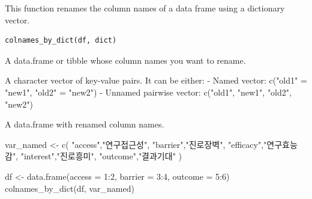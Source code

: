 \documentclass[a4paper]{book}
\begin{document}
%
\begin{Description}
This function renames the column names of a data frame using a dictionary vector.
\end{Description}
%
\begin{Usage}
\begin{verbatim}
colnames_by_dict(df, dict)
\end{verbatim}
\end{Usage}
%
\begin{Arguments}
\begin{ldescription}
\item[\code{df}] A data.frame or tibble whose column names you want to rename.

\item[\code{dict}] A character vector of key-value pairs.
It can be either:
- Named vector: c("old1" = "new1", "old2" = "new2")
- Unnamed pairwise vector: c("old1", "new1", "old2", "new2")
\end{ldescription}
\end{Arguments}
%
\begin{Value}
A data.frame with renamed column names.
\end{Value}
%
\begin{Examples}
\begin{ExampleCode}
var_named <- c(
  "access","연구접근성",
  "barrier","진로장벽",
  "efficacy","연구효능감",
  "interest","진로흥미",
  "outcome","결과기대"
)

df <- data.frame(access = 1:2, barrier = 3:4, outcome = 5:6)
colnames_by_dict(df, var_named)
\end{ExampleCode}
\end{Examples}
\end{document}

